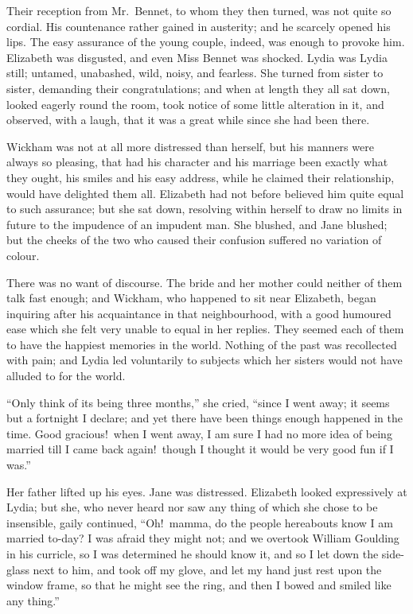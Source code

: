 \documentclass[12pt,english,oneside]{book}
\begin{document}
Their reception from Mr.\ Bennet, to whom they then turned, was not
quite so cordial. His countenance rather gained in austerity; and
he scarcely opened his lips. The easy assurance of the young couple,
indeed, was enough to provoke him. Elizabeth was disgusted, and even
Miss Bennet was shocked. Lydia was Lydia still; untamed, unabashed,
wild, noisy, and fearless. She turned from sister to sister, demanding
their congratulations; and when at length they all sat down, looked
eagerly round the room, took notice of some little alteration in it,
and observed, with a laugh, that it was a great while since she had
been there.

Wickham was not at all more distressed than herself, but his manners
were always so pleasing, that had his character and his marriage been
exactly what they ought, his smiles and his easy address, while he
claimed their relationship, would have delighted them all. Elizabeth
had not before believed him quite equal to such assurance; but she
sat down, resolving within herself to draw no limits in future to
the impudence of an impudent man. She blushed, and Jane blushed; but
the cheeks of the two who caused their confusion suffered no variation
of colour.

There was no want of discourse. The bride and her mother could neither
of them talk fast enough; and Wickham, who happened to sit near Elizabeth,
began inquiring after his acquaintance in that neighbourhood, with
a good humoured ease which she felt very unable to equal in her replies.
They seemed each of them to have the happiest memories in the world.
Nothing of the past was recollected with pain; and Lydia led voluntarily
to subjects which her sisters would not have alluded to for the world.

{}``Only think of its being three months,'' she cried, {}``since
I went away; it seems but a fortnight I declare; and yet there have
been things enough happened in the time. Good gracious!\ when I went
away, I am sure I had no more idea of being married till I came back
again!\ though I thought it would be very good fun if I was.''

Her father lifted up his eyes. Jane was distressed. Elizabeth looked
expressively at Lydia; but she, who never heard nor saw any thing
of which she chose to be insensible, gaily continued, {}``Oh!\ mamma,
do the people hereabouts know I am married to-day? I was afraid they
might not; and we overtook William Goulding in his curricle, so I
was determined he should know it, and so I let down the side-glass
next to him, and took off my glove, and let my hand just rest upon
the window frame, so that he might see the ring, and then I bowed
and smiled like any thing.''
\end{document}
